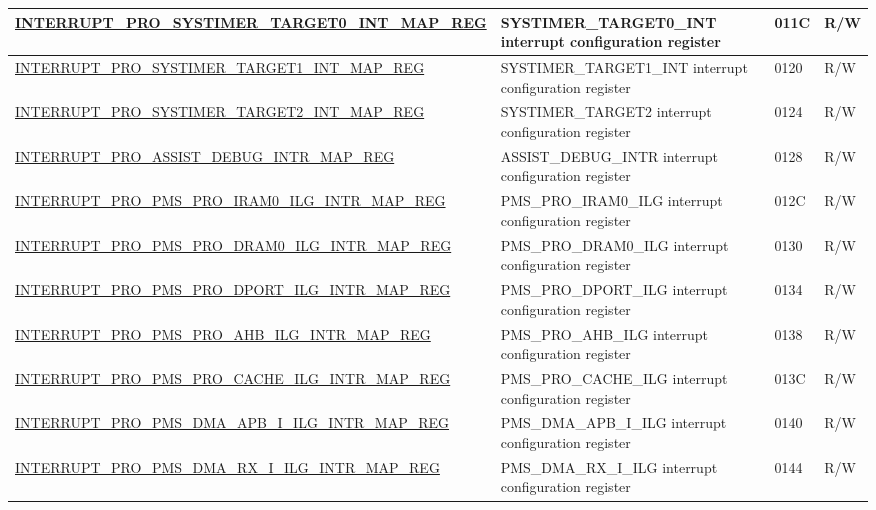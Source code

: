 \begin{longtable}{ | m{9.3cm} | m{9.2cm} | m{1.3cm} | m{1.2cm} | }
\hyperref[regdesc:INTERRUPTPROSYSTIMERTARGET0INTMAPREG]{INTERRUPT\_PRO\_SYSTIMER\_TARGET0\_INT\_MAP\_REG} & SYSTIMER\_TARGET0\_INT interrupt configuration register & \hexprefix{}011C & R/W \\ \hline
\hyperref[regdesc:INTERRUPTPROSYSTIMERTARGET1INTMAPREG]{INTERRUPT\_PRO\_SYSTIMER\_TARGET1\_INT\_MAP\_REG} & SYSTIMER\_TARGET1\_INT interrupt configuration register & \hexprefix{}0120 & R/W \\ \hline
\hyperref[regdesc:INTERRUPTPROSYSTIMERTARGET2INTMAPREG]{INTERRUPT\_PRO\_SYSTIMER\_TARGET2\_INT\_MAP\_REG} & SYSTIMER\_TARGET2 interrupt configuration register & \hexprefix{}0124 & R/W \\ \hline
\hyperref[regdesc:INTERRUPTPROASSISTDEBUGINTRMAPREG]{INTERRUPT\_PRO\_ASSIST\_DEBUG\_INTR\_MAP\_REG} & ASSIST\_DEBUG\_INTR interrupt configuration register & \hexprefix{}0128 & R/W \\ \hline
\hyperref[regdesc:INTERRUPTPROPMSPROIRAM0ILGINTRMAPREG]{INTERRUPT\_PRO\_PMS\_PRO\_IRAM0\_ILG\_INTR\_MAP\_REG} & PMS\_PRO\_IRAM0\_ILG interrupt configuration register & \hexprefix{}012C & R/W \\ \hline
\hyperref[regdesc:INTERRUPTPROPMSPRODRAM0ILGINTRMAPREG]{INTERRUPT\_PRO\_PMS\_PRO\_DRAM0\_ILG\_INTR\_MAP\_REG} & PMS\_PRO\_DRAM0\_ILG interrupt configuration register & \hexprefix{}0130 & R/W \\ \hline
\hyperref[regdesc:INTERRUPTPROPMSPRODPORTILGINTRMAPREG]{INTERRUPT\_PRO\_PMS\_PRO\_DPORT\_ILG\_INTR\_MAP\_REG} & PMS\_PRO\_DPORT\_ILG interrupt configuration register & \hexprefix{}0134 & R/W \\ \hline
\hyperref[regdesc:INTERRUPTPROPMSPROAHBILGINTRMAPREG]{INTERRUPT\_PRO\_PMS\_PRO\_AHB\_ILG\_INTR\_MAP\_REG} & PMS\_PRO\_AHB\_ILG interrupt configuration register & \hexprefix{}0138 & R/W \\ \hline
\hyperref[regdesc:INTERRUPTPROPMSPROCACHEILGINTRMAPREG]{INTERRUPT\_PRO\_PMS\_PRO\_CACHE\_ILG\_INTR\_MAP\_REG} & PMS\_PRO\_CACHE\_ILG interrupt configuration register & \hexprefix{}013C & R/W \\ \hline
\hyperref[regdesc:INTERRUPTPROPMSDMAAPBIILGINTRMAPREG]{INTERRUPT\_PRO\_PMS\_DMA\_APB\_I\_ILG\_INTR\_MAP\_REG} & PMS\_DMA\_APB\_I\_ILG interrupt configuration register & \hexprefix{}0140 & R/W \\ \hline
\hyperref[regdesc:INTERRUPTPROPMSDMARXIILGINTRMAPREG]{INTERRUPT\_PRO\_PMS\_DMA\_RX\_I\_ILG\_INTR\_MAP\_REG} & PMS\_DMA\_RX\_I\_ILG interrupt configuration register & \hexprefix{}0144 & R/W \\ \hline

\end{longtable}

